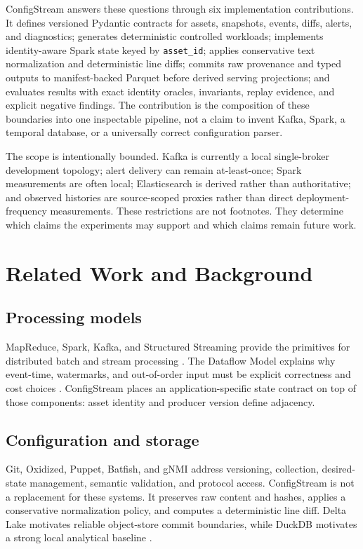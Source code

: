 \documentclass[a4paper,11pt]{article}
\begin{document}
ConfigStream answers these questions through six implementation contributions. It defines versioned Pydantic contracts for assets, snapshots, events, diffs, alerts, and diagnostics; generates deterministic controlled workloads; implements identity-aware Spark state keyed by \texttt{asset\_id}; applies conservative text normalization and deterministic line diffs; commits raw provenance and typed outputs to manifest-backed Parquet before derived serving projections; and evaluates results with exact identity oracles, invariants, replay evidence, and explicit negative findings. The contribution is the composition of these boundaries into one inspectable pipeline, not a claim to invent Kafka, Spark, a temporal database, or a universally correct configuration parser.

The scope is intentionally bounded. Kafka is currently a local single-broker development topology; alert delivery can remain at-least-once; Spark measurements are often local; Elasticsearch is derived rather than authoritative; and observed histories are source-scoped proxies rather than direct deployment-frequency measurements. These restrictions are not footnotes. They determine which claims the experiments may support and which claims remain future work.

\section{Related Work and Background}
\subsection{Processing models}
MapReduce, Spark, Kafka, and Structured Streaming provide the primitives for distributed batch and stream processing \citep{DeanGhemawat2004MapReduce,ZahariaEtAl2012RDD,KrepsNarkhedeRao2011Kafka,ArmbrustEtAl2018StructuredStreaming}. The Dataflow Model explains why event-time, watermarks, and out-of-order input must be explicit correctness and cost choices \citep{AkidauEtAl2015Dataflow}. ConfigStream places an application-specific state contract on top of those components: asset identity and producer version define adjacency.

\subsection{Configuration and storage}
Git, Oxidized, Puppet, Batfish, and gNMI address versioning, collection, desired-state management, semantic validation, and protocol access. ConfigStream is not a replacement for these systems. It preserves raw content and hashes, applies a conservative normalization policy, and computes a deterministic line diff. Delta Lake motivates reliable object-store commit boundaries, while DuckDB motivates a strong local analytical baseline \citep{ArmbrustEtAl2020Delta,RaasveldtMuhleisen2019DuckDB}.
\end{document}
